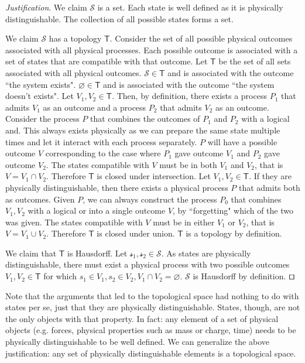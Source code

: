 \documentclass[smallextended]{svjour3}
\numberwithin{equation}{section}
\newenvironment{justification}{\emph{Justification}.}{\hfill\(\qed\)}
\theoremstyle{definition}
\newenvironment{justification}{\emph{Justification}.}{\qed}
\begin{document}
\begin{justification}
We claim $\mathcal{S}$ is a set. Each state is well defined as it is physically distinguishable. The collection of all possible states forms a set.

We claim $\mathcal{S}$ has a topology $\mathsf{T}$. Consider the set of all possible physical outcomes associated with all physical processes. Each possible outcome is associated with a set of states that are compatible with that outcome. Let $\mathsf{T}$ be the set of all sets associated with all physical outcomes. $\mathcal{S} \in \mathsf{T}$ and is associated with the outcome ``the system exists". $\varnothing \in \mathsf{T}$ and is associated with the outcome ``the system doesn't exists". Let $V_1, V_2 \in \mathsf{T}$. Then, by definition, there exists a process $P_1$ that admits $V_1$ as an outcome and a process $P_2$ that admits $V_2$ as an outcome. Consider the process $P$ that combines the outcomes of $P_1$ and $P_2$ with a logical and. This always exists physically as we can prepare the same state multiple times and let it interact with each process separately. $P$ will have a possible outcome $V$ corresponding to the case where $P_1$ gave outcome $V_1$ and $P_2$ gave outcome $V_2$. The states compatible with $V$ must be in both $V_1$ and $V_2$, that is $V = V_1 \cap V_2$. Therefore $\mathsf{T}$ is closed under intersection. Let $V_1, V_2 \in \mathsf{T}$. If they are physically distinguishable, then there exists a physical process $P$ that admits both as outcomes. Given $P$, we can always construct the process $P_0$ that combines $V_1, V_2$ with a logical or into a single outcome $V$, by ``forgetting" which of the two was given. The states compatible with $V$ must be in either $V_1$ or $V_2$, that is $V = V_1 \cup V_2$. Therefore $\mathsf{T}$ is closed under union. $\mathsf{T}$ is a topology by definition.

We claim that $\mathsf{T}$ is Hausdorff. Let $\mathcal{s_1}, \mathcal{s_2} \in \mathcal{S}$. As states are physically distinguishable, there must exist a physical process with two possible outcomes $V_1, V_2 \in \mathsf{T}$ for which $s_1 \in V_1, s_2 \in V_2, V_1 \cap V_2 = \varnothing$. $\mathcal{S}$ is Hausdorff by definition.
\end{justification}

Note that the arguments that led to the topological space had nothing to do with states per se, just that they are physically distinguishable. States, though, are not the only objects with that property. In fact: any element of a set of physical objects (e.g. forces, physical properties such as mass or charge, time) needs to be physically distinguishable to be well defined. We can generalize the above justification: any set of physically distinguishable elements is a topological space.
\end{document}
